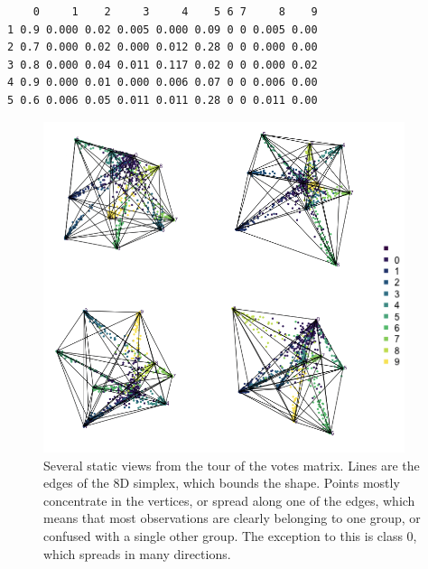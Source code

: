 \documentclass[
  letterpaper,
]{krantz}
\newenvironment{Shaded}{\begin{snugshade}}{\end{snugshade}}
\newcommand{\DecValTok}[1]{\textcolor[rgb]{0.68,0.00,0.00}{#1}}
\newcommand{\FunctionTok}[1]{\textcolor[rgb]{0.28,0.35,0.67}{#1}}
\newcommand{\NormalTok}[1]{\textcolor[rgb]{0.00,0.23,0.31}{#1}}
\newcommand{\SpecialCharTok}[1]{\textcolor[rgb]{0.37,0.37,0.37}{#1}}
\begin{document}
\begin{Shaded}
\end{Shaded}

\begin{verbatim}
    0     1    2     3     4    5 6 7     8    9
1 0.9 0.000 0.02 0.005 0.000 0.09 0 0 0.005 0.00
2 0.7 0.000 0.02 0.000 0.012 0.28 0 0 0.000 0.00
3 0.8 0.000 0.04 0.011 0.117 0.02 0 0 0.000 0.02
4 0.9 0.000 0.01 0.000 0.006 0.07 0 0 0.006 0.00
5 0.6 0.006 0.05 0.011 0.011 0.28 0 0 0.011 0.00
\end{verbatim}

\begin{figure}

\begin{minipage}{0.50\linewidth}

\includegraphics[width=4.16667in,height=\textheight]{images/ft-votes.png}

\end{minipage}%

\caption{\label{fig-ft-votes-pdf}Several static views from the tour of
the votes matrix. Lines are the edges of the 8D simplex, which bounds
the shape. Points mostly concentrate in the vertices, or spread along
one of the edges, which means that most observations are clearly
belonging to one group, or confused with a single other group. The
exception to this is class 0, which spreads in many directions.}

\end{figure}%
\end{document}
